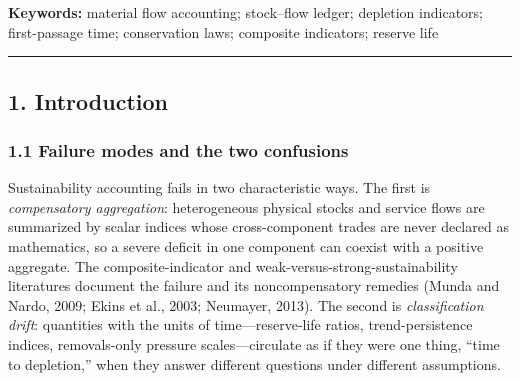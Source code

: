 \documentclass[11pt]{article}
\begin{document}
\begin{abstract}
Three public-data applications are classified as what they are. For example, the G3P anomaly index is a statistical index, not a stock ratio. The phosphate reserve-life ratio is arithmetic, not a forecast. The fisheries removals-only time is a pressure scale, not a depletion diagnostic. No nonnegative weighting of component balances certifies that every component clears its floor, and five double-counting rules keep phantom mass out of the books. First-passage semantics on declared stochastic surrogates are computed against a barrier the record itself defines, and carry explicit non-claims. Weak and strong sustainability turn out to be two regimes of one system, divided by whether the material cycle closes at the rate of use.

What we deliver, then, is a grammar for material depletion claims. Each claim carries the predicate it actually establishes, and no claim is carried beyond it. An interface contract fixes the one object we share with delay-based institutional dynamics, so the two cannot be read as one programme.

\end{abstract}

\textbf{Keywords:} material flow accounting; stock--flow ledger;
depletion indicators; first-passage time; conservation laws; composite
indicators; reserve life

\begin{center}\rule{0.5\linewidth}{0.5pt}\end{center}

\subsection{1. Introduction}\label{introduction}

\subsubsection{1.1 Failure modes and the two
confusions}\label{failure-modes-and-the-two-confusions}

Sustainability accounting fails in two characteristic ways. The first is
\emph{compensatory aggregation}: heterogeneous physical stocks and
service flows are summarized by scalar indices whose cross-component
trades are never declared as mathematics, so a severe deficit in one
component can coexist with a positive aggregate. The composite-indicator
and weak-versus-strong-sustainability literatures document the failure
and its noncompensatory remedies (Munda and Nardo, 2009; Ekins et al.,
2003; Neumayer, 2013). The second is \emph{classification drift}:
quantities with the units of time---reserve-life ratios,
trend-persistence indices, removals-only pressure scales---circulate
as if they were one thing, ``time to depletion,'' when they answer
different questions under different assumptions.
\end{document}
